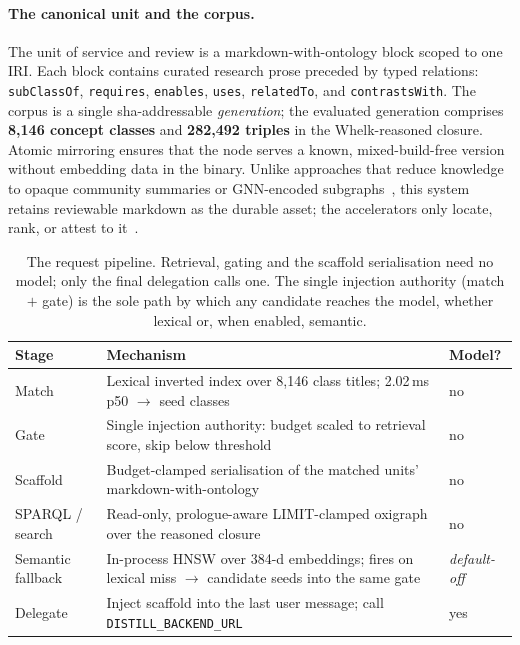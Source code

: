 \documentclass[10pt,twocolumn]{article}
\begin{document}
\paragraph{The canonical unit and the corpus.} The unit of service and review is a markdown-with-ontology block scoped to one IRI. Each block contains curated research prose preceded by typed relations: \texttt{subClassOf}, \texttt{requires}, \texttt{enables}, \texttt{uses}, \texttt{relatedTo}, and \texttt{contrastsWith}. The corpus is a single sha-addressable \emph{generation}; the evaluated generation comprises \textbf{8{,}146 concept classes} and \textbf{282{,}492 triples} in the Whelk-reasoned closure. Atomic mirroring ensures that the node serves a known, mixed-build-free version without embedding data in the binary. Unlike approaches that reduce knowledge to opaque community summaries or GNN-encoded subgraphs~\cite{edge2024graphrag,he2024gretriever}, this system retains reviewable markdown as the durable asset; the accelerators only locate, rank, or attest to it~\cite{garcez2023neurosymbolic}.

\begin{table}[t]\centering\small
\caption{The request pipeline. Retrieval, gating and the scaffold serialisation need no model; only
the final delegation calls one. The single injection authority (match $+$ gate) is the sole path by
which any candidate reaches the model, whether lexical or, when enabled, semantic.}
\label{tab:pipeline}
\renewcommand{\arraystretch}{1.15}
\begin{tabularx}{\textwidth}{@{}>{\raggedright\arraybackslash}p{2.7cm} >{\raggedright\arraybackslash}X >{\centering\arraybackslash}p{2.2cm}@{}}
\toprule
Stage & Mechanism & Model? \\
\midrule
Match & Lexical inverted index over 8{,}146 class titles; 2.02\,ms p50 $\to$ seed classes & no \\
Gate & Single injection authority: budget scaled to retrieval score, skip below threshold & no \\
Scaffold & Budget-clamped serialisation of the matched units' markdown-with-ontology & no \\
SPARQL / search & Read-only, prologue-aware LIMIT-clamped oxigraph over the reasoned closure & no \\
Semantic fallback & In-process HNSW over 384-d embeddings; fires on lexical miss $\to$ candidate seeds into the same gate & \emph{default-off} \\
Delegate & Inject scaffold into the last user message; call \texttt{DISTILL\_BACKEND\_URL} & yes \\
\bottomrule
\end{tabularx}
\end{table}
\end{document}
